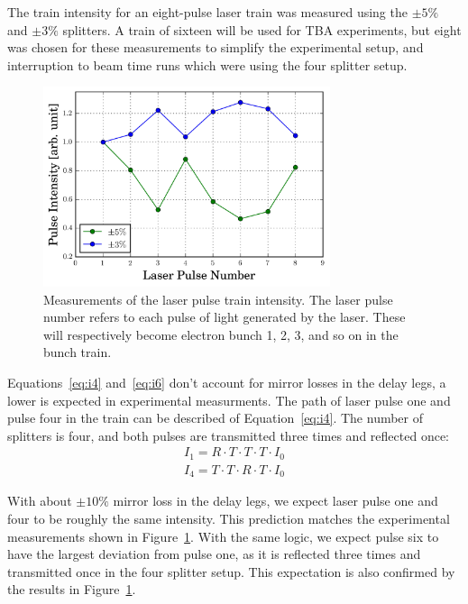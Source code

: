 The train intensity for an eight-pulse laser train was measured using the $\pm5\%$ and $\pm3\%$ splitters.
A train of sixteen will be used for TBA experiments, but eight was chosen for these measurements to
simplify the experimental setup, and  interruption to beam time 
runs which were using the four splitter setup. 
\begin{figure}%
	\begin{center}
		\includegraphics[width=0.75\textwidth]{images/splitter_improvement}
		\caption{Measurements of the laser pulse train intensity. The laser pulse number refers to 
			each pulse of light generated by the laser. These will respectively become electron bunch 1, 2, 3, and so on
			in the bunch train.}\label{fig:origtrain}
	\end{center}
\end{figure}
Equations~\ref{eq:i4} and~\ref{eq:i6} don't account for mirror losses in the delay legs, 
 a lower  is expected in experimental measurments. The path of laser pulse one and
pulse four in the train can be described  of Equation~\ref{eq:i4}.
The number of splitters is  four, and both pulses are transmitted three 
times and reflected once: 
\begin{align}
I_1 = R \cdot T \cdot T \cdot T \cdot I_0 \\
I_4 = T \cdot T \cdot R \cdot T \cdot I_0 
\end{align}

With about $\pm10\%$ mirror loss in the delay legs, we expect laser pulse one and four 
to be roughly the same intensity. This prediction matches the experimental measurements 
shown in Figure~\ref{fig:origtrain}. With the same 
logic, we expect pulse six to have the largest deviation from pulse one, as it is reflected 
three times and transmitted once in the four splitter setup. This expectation is also 
confirmed by the results in Figure~\ref{fig:origtrain}.  

